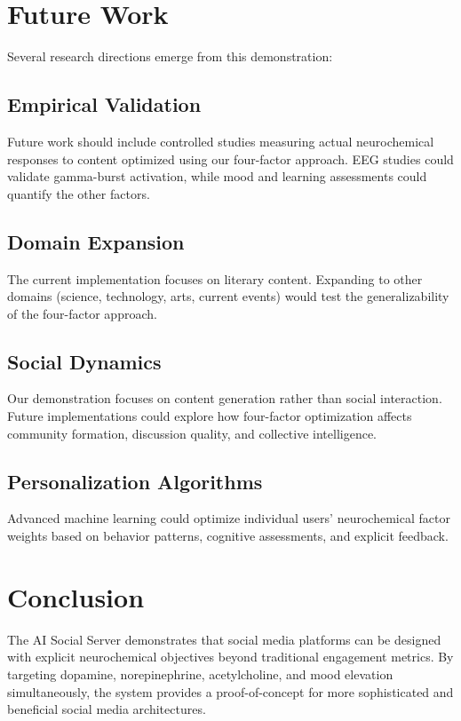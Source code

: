 \documentclass{article}
\begin{document}
\section{Future Work}

Several research directions emerge from this demonstration:

\subsection{Empirical Validation}
Future work should include controlled studies measuring actual neurochemical responses to content optimized using our four-factor approach. EEG studies could validate gamma-burst activation, while mood and learning assessments could quantify the other factors.

\subsection{Domain Expansion}
The current implementation focuses on literary content. Expanding to other domains (science, technology, arts, current events) would test the generalizability of the four-factor approach.

\subsection{Social Dynamics}
Our demonstration focuses on content generation rather than social interaction. Future implementations could explore how four-factor optimization affects community formation, discussion quality, and collective intelligence.

\subsection{Personalization Algorithms}
Advanced machine learning could optimize individual users' neurochemical factor weights based on behavior patterns, cognitive assessments, and explicit feedback.

\section{Conclusion}

The AI Social Server demonstrates that social media platforms can be designed with explicit neurochemical objectives beyond traditional engagement metrics. By targeting dopamine, norepinephrine, acetylcholine, and mood elevation simultaneously, the system provides a proof-of-concept for more sophisticated and beneficial social media architectures.
\end{document}
